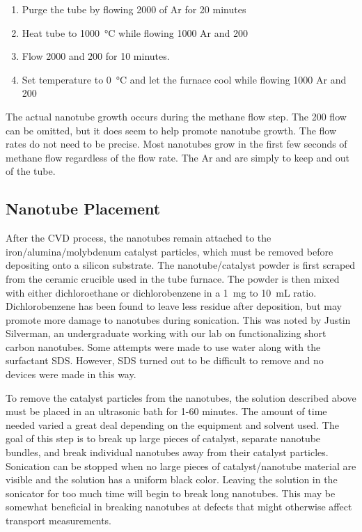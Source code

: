 \begin{enumerate}
	\item Purge the tube by flowing \SI{2000}{\sccm} of Ar for 20 minutes
	\item Heat tube to \SI{1000}{\degreeCelsius} while flowing \SI{1000}{\sccm} Ar and \SI{200}{\sccm} 
	\item Flow \SI{2000}{\sccm}  and \SI{200}{\sccm}  for 10 minutes.
	\item Set temperature to \SI{0}{\degreeCelsius} and let the furnace cool while flowing \SI{1000}{\sccm} Ar and \SI{200}{\sccm} 
\end{enumerate}

\noindent The actual nanotube growth occurs during the methane flow step. The \SI{200}{\sccm}  flow can be omitted, but it does seem to help promote nanotube growth. The flow rates do not need to be precise. Most nanotubes grow in the first few seconds of methane flow regardless of the flow rate. The Ar and  are simply to keep  and  out of the tube. 

\subsection{Nanotube Placement}

After the CVD process, the nanotubes remain attached to the iron\slash alumina\slash molybdenum catalyst particles, which must be removed before depositing onto a silicon substrate. The nanotube\slash catalyst powder is first scraped from the ceramic crucible used in the tube furnace. The powder is then mixed with either dichloroethane or dichlorobenzene in a \SI{1}{\milli\gram} to \SI{10}{\milli\liter} ratio. Dichlorobenzene has been found to leave less residue after deposition, but may promote more damage to nanotubes during sonication. This was noted by Justin Silverman, an undergraduate working with our lab on functionalizing short carbon nanotubes. Some attempts were made to use water along with the surfactant SDS. However, SDS turned out to be difficult to remove and no devices were made in this way.

To remove the catalyst particles from the nanotubes, the solution described above must be placed in an ultrasonic bath for 1-60 minutes. The amount of time needed varied a great deal depending on the equipment and solvent used. The goal of this step is to break up large pieces of catalyst, separate nanotube bundles, and break individual nanotubes away from their catalyst particles. Sonication can be stopped when no large pieces of catalyst\slash nanotube material are visible and the solution has a uniform black color. Leaving the solution in the sonicator for too much time will begin to break long nanotubes. This may be somewhat beneficial in breaking nanotubes at defects that might otherwise affect transport measurements.

